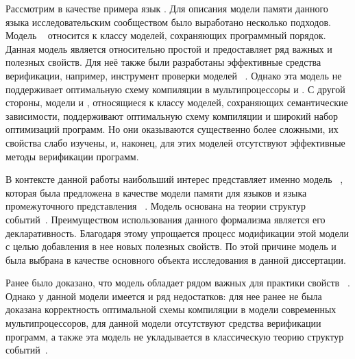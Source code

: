 
Рассмотрим в качестве примера язык \CPP.
Для описания модели памяти данного языка исследовательским
сообществом было выработано несколько подходов.
Модель \RCMM~\autocite{Lahav-al:PLDI17}
относится к классу моделей, сохраняющих программный порядок.
Данная модель является относительно простой и
предоставляет ряд важных и полезных свойств.
Для неё также были разработаны эффективные
средства верификации, например, инструмент проверки моделей \genmc~\autocite{Kokologiannakis:PLDI2019}.
Однако эта модель не поддерживает оптимальную схему компиляции в мультипроцессоры \ARM и \POWER.
С другой стороны, модели \Prm и \Wkm, относящиеся к классу моделей,
сохраняющих семантические зависимости,
поддерживают оптимальную схему компиляции и широкий набор оптимизаций программ.
Но они оказываются существенно более сложными, их свойства слабо изучены,
и, наконец, для этих моделей отсутствуют эффективные методы верификации программ. 

В контексте данной работы наибольший интерес
представляет именно модель \Wkm~\autocite{Chakraborty-Vafeiadis:POPL19},
которая была предложена в качестве модели памяти
для языков \CPP и языка промежуточного представления \LLVM%
~\autocite{Chakraborty-Vafeiadis:CGO17}.
Модель \Wkm основана на теории структур событий~\autocite{Winskel:86,Winskel:ICALP1982}.
Преимуществом использования данного формализма является его декларативность.
Благодаря этому упрощается процесс модификации этой модели
с целью добавления в нее новых полезных свойств.
По этой причине модель \Wkm и была выбрана в качестве
основного объекта исследования в данной диссертации.

Ранее было доказано, что модель \Wkm обладает рядом важных для практики свойств%
~\autocite{Chakraborty-Vafeiadis:POPL19}.
Однако у данной модели имеется и ряд недостатков:
для нее ранее не была доказана корректность оптимальной схемы
компиляции в модели современных мультипроцессоров,
для данной модели отсутствуют средства верификации программ,
а также эта модель не укладывается в классическую теорию структур событий~\cite{Winskel:86}.

